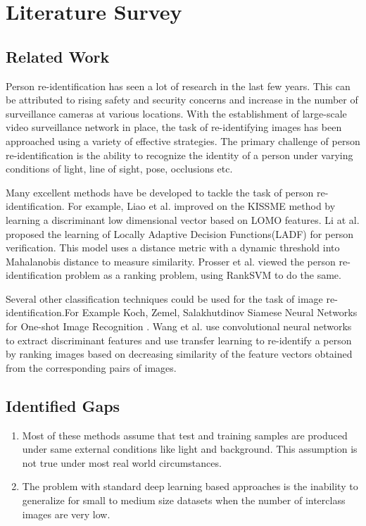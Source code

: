\documentclass{article}[12pt,a4paper]
\begin{document}
\section{Literature Survey}

\subsection{Related Work}
Person re-identification has seen a lot of research in the last few years. This can be attributed to rising safety and security concerns and increase in the number of surveillance cameras at various locations. With the establishment of large-scale video surveillance network in place, the task of re-identifying images has been approached using a variety of effective strategies. The primary challenge of person re-identification is the ability to recognize the identity of a person under varying conditions of light, line of sight, pose, occlusions etc.

Many excellent methods have be developed to tackle the task of person re-identification. For example, Liao et al. \cite{LOMO} improved on the KISSME method by learning a discriminant low dimensional vector based on LOMO features. Li at al. \cite{LADF} proposed the learning of Locally Adaptive Decision Functions(LADF) for person verification. This model uses a distance metric with a dynamic threshold into Mahalanobis distance to measure similarity. Prosser et al. \cite{RankSVM} viewed the person re-identification problem as a ranking problem, using RankSVM to do the same.

Several other classification techniques could be used for the task of image re-identification.For Example Koch, Zemel, Salakhutdinov Siamese Neural Networks for One-shot Image Recognition \cite{siamese}. Wang et al. use convolutional neural networks to extract discriminant features and use transfer learning to re-identify a person by ranking images based on decreasing similarity of the feature vectors obtained from the corresponding pairs of images.
\newpage

\subsection{Identified Gaps}
\begin{enumerate}
\item Most of these methods assume that test and training samples are produced under same external conditions like light and background. This assumption is not true under most real world circumstances.
\item The problem with standard deep learning based approaches is the inability to generalize for small to medium size datasets when the number of interclass images are very low.
\end{enumerate}
\end{document}
